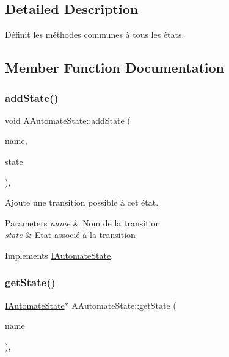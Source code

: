 \subsection{Detailed Description}
Définit les méthodes communes à tous les états. 

\subsection{Member Function Documentation}
\mbox{\label{classAAutomateState_a2f141db7bda71b605195c3516b0dac51}} 
\subsubsection{\texorpdfstring{add\+State()}{addState()}}
{\footnotesize\ttfamily void A\+Automate\+State\+::add\+State (\begin{DoxyParamCaption}\item[{const std\+::string \&}]{name,  }\item[{\hyperlink{classIAutomateState}{I\+Automate\+State} $\ast$}]{state }\end{DoxyParamCaption})\hspace{0.3cm}{\ttfamily [inline]}, {\ttfamily [virtual]}}



Ajoute une transition possible à cet état. 


\begin{DoxyParams}{Parameters}
{\em name} & Nom de la transition \\
\hline
{\em state} & Etat associé à la transition \\
\hline
\end{DoxyParams}


Implements \hyperlink{classIAutomateState_a2d088c807e6d7b30b93511096a34af2a}{I\+Automate\+State}.

\mbox{\label{classAAutomateState_a98966c27660941825dba0da7130a957f}} 
\subsubsection{\texorpdfstring{get\+State()}{getState()}}
{\footnotesize\ttfamily \hyperlink{classIAutomateState}{I\+Automate\+State}$\ast$ A\+Automate\+State\+::get\+State (\begin{DoxyParamCaption}\item[{const std\+::string \&}]{name }\end{DoxyParamCaption})\hspace{0.3cm}{\ttfamily [inline]}, {\ttfamily [virtual]}}



